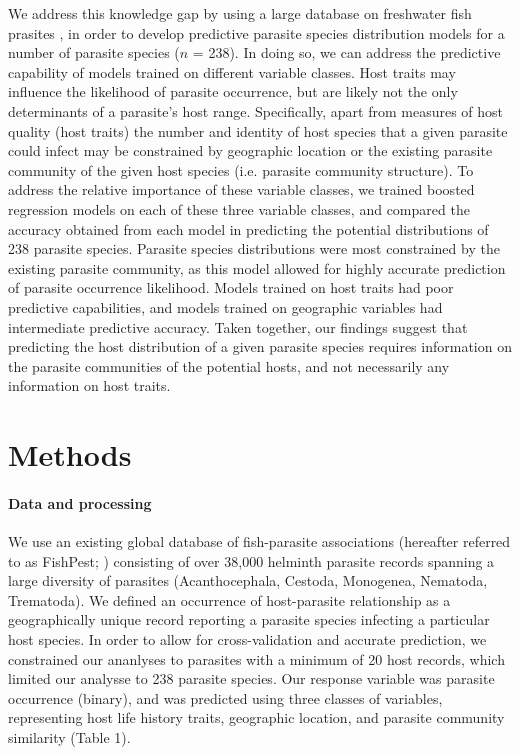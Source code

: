 \documentclass[12pt]{article}
\begin{document}
   
 We address this knowledge gap by using a large database on freshwater fish prasites \cite{strona2013}, in order to develop predictive parasite species distribution models for a number of parasite species ($n$ = 238). In doing so, we can address the predictive capability of models trained on different variable classes. Host traits may influence the likelihood of parasite occurrence, but are likely not the only determinants of a parasite's host range. Specifically, apart from measures of host quality (host traits) the number and identity of host species that a given parasite could infect may be constrained by geographic location or the existing parasite community of the given host species (i.e. parasite community structure). To address the relative importance of these variable classes, we trained boosted regression models on each of these three variable classes, and compared the accuracy obtained from each model in predicting the potential distributions of 238 parasite species. Parasite species distributions were most constrained by the existing parasite community, as this model allowed for highly accurate prediction of parasite occurrence likelihood. Models trained on host traits had poor predictive capabilities, and models trained on geographic variables had intermediate predictive accuracy. Taken together, our findings suggest that predicting the host distribution of a given parasite species requires information on the parasite communities of the potential hosts, and not necessarily any information on host traits. 
  
 

\section*{Methods}
 \paragraph{Data and processing}
  We use an existing global database of fish-parasite associations (hereafter referred to as FishPest; \cite{strona2013}) consisting of over 38,000 helminth parasite records spanning a large diversity of parasites (Acanthocephala, Cestoda, Monogenea, Nematoda, Trematoda). We defined an occurrence of host-parasite relationship as a geographically unique record reporting a parasite species infecting a particular host species. In order to allow for cross-validation and accurate prediction, we constrained our ananlyses to parasites with a minimum of 20 host records, which limited our analysse to 238 parasite species. Our response variable was parasite occurrence (binary), and was predicted using three classes of variables, representing host life history traits, geographic location, and parasite community similarity (Table 1). \\
  
\end{document}
